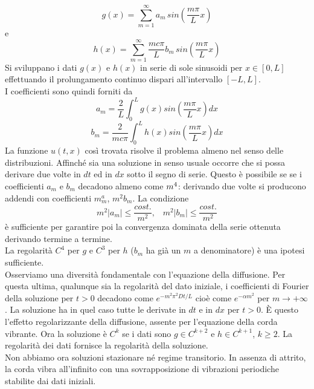 \[
	g(x)= \sum_{m=1}^{\infty} a_m \, sin \left( \frac{m\pi}{L} x \right)
\]
e
\[
	h(x)= \sum_{m=1}^{\infty} \frac{mc\pi}{L} b_m \, sin \left(
	\frac{m\pi}{L} x \right)
\]
Si sviluppano i dati $g(x)$ e $h(x)$ in serie di sole sinusoidi per $x \in
[0,L]$ effettuando il prolungamento continuo dispari all'intervallo $[-L,L]$.\\
I coefficienti sono quindi forniti da
\[
	a_m= \frac{2}{L} \int_0^L g(x) sin \left( \frac{m\pi}{L} x \right) dx
\]
\[
	b_m= \frac{2}{mc \pi} \int_0^L h(x) sin \left( \frac{m\pi}{L} x \right)
dx
\]
La funzione $u(t,x)$ cos\`i trovata risolve il problema almeno nel senso delle
distribuzioni.
Affinch\'e sia una soluzione in senso usuale occorre che si possa derivare due
volte in $dt$ ed in $dx$ sotto il segno di serie.
Questo \`e possibile se se i coefficienti $a_m$ e $b_m$ decadono almeno come
$\/m^4$: derivando due volte si producono addendi con coefficienti $m^a_m$,
$m^2b_m$. La condizione
\[
	m^2|a_m|\leq \frac{cost.}{m^2}, \;\;\; m^2|b_m|\leq \frac{cost.}{m^2}
\]
\`e sufficiente per garantire poi la convergenza dominata della serie ottenuta
derivando termine a termine.\\
La regolarit\`a $C^4$ per $g$ e $C^3$ per $h$ ($b_m$ ha gi\`a un $m$ a
denominatore) \`e una ipotesi sufficiente.\\
Osserviamo una diversit\`a fondamentale con l'equazione della diffusione. Per
questa ultima, qualunque sia la regolarit\`a del dato iniziale, i coefficienti
di Fourier della soluzione per $t>0$ decadono come $e^{-m^2 \pi^2 Dt/L}$ cio\`e
come $e^{-\alpha m^2}$ per $m \to +\infty$.
La soluzione ha in quel caso tutte le derivate in $dt$ e in $dx$ per $t>0$.
\`E questo l'effetto regolarizzante della diffusione, assente per l'equazione
della corda vibrante. Ora la soluzione \`e $C^k$ se i dati sono $g \in C^{k+2}$
e $h \in C^{k+1}$, $k\geq 2$. La regolarit\`a dei dati fornisce la regolarit\`a
della soluzione.\\
Non abbiamo ora soluzioni stazionare n\'e regime transitorio. In assenza di
attrito, la corda vibra all'infinito con una sovrapposizione di vibrazioni
periodiche stabilite dai dati iniziali.
